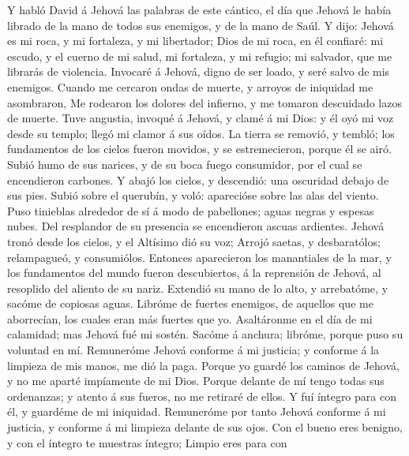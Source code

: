  Y habló David á Jehová las palabras de este cántico, el día
que Jehová le había librado de la mano de todos sus enemigos, y de la
mano de Saúl.  Y dijo: Jehová es mi roca, y mi fortaleza, y
mi libertador;  Dios de mi roca, en él confiaré: mi escudo,
y el cuerno de mi salud, mi fortaleza, y mi refugio; mi salvador, que me
librarás de violencia.  Invocaré á Jehová, digno de ser
loado, y seré salvo de mis enemigos.  Cuando me cercaron
ondas de muerte, y arroyos de iniquidad me asombraron,  Me
rodearon los dolores del infierno, y me tomaron descuidado lazos de
muerte.  Tuve angustia, invoqué á Jehová, y clamé á mi Dios:
y él oyó mi voz desde su templo; llegó mi clamor á sus oídos.
 La tierra se removió, y tembló; los fundamentos de los
cielos fueron movidos, y se estremecieron, porque él se airó.
 Subió humo de sus narices, y de su boca fuego consumidor,
por el cual se encendieron carbones.  Y abajó los cielos, y
descendió: una oscuridad debajo de sus pies.  Subió sobre
el querubín, y voló: aparecióse sobre las alas del viento. 
Puso tinieblas alrededor de sí á modo de pabellones; aguas negras y
espesas nubes.  Del resplandor de su presencia se
encendieron ascuas ardientes.  Jehová tronó desde los
cielos, y el Altísimo dió su voz;  Arrojó saetas, y
desbaratólos; relampagueó, y consumiólos.  Entonces
aparecieron los manantiales de la mar, y los fundamentos del mundo
fueron descubiertos, á la reprensión de Jehová, al resoplido del aliento
de su nariz.  Extendió su mano de lo alto, y arrebatóme, y
sacóme de copiosas aguas.  Libróme de fuertes enemigos, de
aquellos que me aborrecían, los cuales eran más fuertes que yo.
 Asaltáronme en el día de mi calamidad; mas Jehová fué mi
sostén.  Sacóme á anchura; libróme, porque puso su voluntad
en mí.  Remuneróme Jehová conforme á mi justicia; y
conforme á la limpieza de mis manos, me dió la paga. 
Porque yo guardé los caminos de Jehová, y no me aparté impíamente de mi
Dios.  Porque delante de mí tengo todas sus ordenanzas; y
atento á sus fueros, no me retiraré de ellos.  Y fuí
íntegro para con él, y guardéme de mi iniquidad. 
Remuneróme por tanto Jehová conforme á mi justicia, y conforme á mi
limpieza delante de sus ojos.  Con el bueno eres benigno, y
con el íntegro te muestras íntegro;  Limpio eres para con
